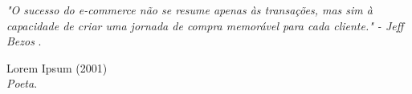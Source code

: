 
\begin{epigrafe}\vspace*{\fill}
    \begin{center}
    	\begin{flushright}\vspace*{1cm}
            \begin{minipage}{.8\textwidth}
            \begin{flushright}
            		\textit{"O sucesso do e-commerce não se resume apenas às transações, mas sim à capacidade de criar uma jornada de compra memorável para cada cliente." - Jeff Bezos
}.\\
        		\end{flushright}
        		\begin{flushright}
        		Lorem Ipsum (2001)\\
        		\textit{Poeta}.
        		\end{flushright}
            \end{minipage}
        \end{flushright}
    \end{center}
\end{epigrafe}